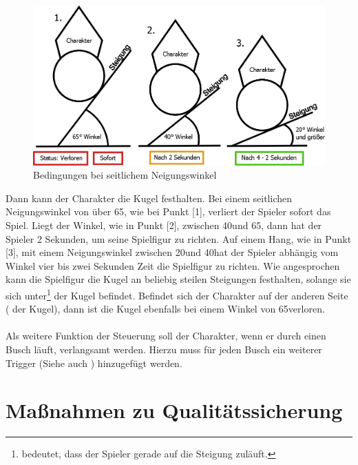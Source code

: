\begin{figure}
\begin{center}
\includegraphics[scale=0.17]{Bilder/Diagramme/VerlierWinkelSeitlich.png}
\end{center}
\begin{footnotesize}
\caption{Bedingungen bei seitlichem Neigungswinkel}
\label{Abb:VerlierWinkelSeitlich}
\end{footnotesize}
\end{figure}

Dann kann der Charakter die Kugel festhalten. Bei einem seitlichen Neigungswinkel von über 65\cc, wie bei Punkt [1], verliert der Spieler sofort das Spiel. Liegt der Winkel, wie in Punkt [2], zwischen 40\cc und 65\cc, dann hat der Spieler 2 Sekunden, um seine Spielfigur zu richten. Auf einem Hang, wie in Punkt [3], mit einem Neigungswinkel zwischen 20\cc und 40\cc hat der Spieler abhängig vom Winkel vier bis zwei Sekunden Zeit die Spielfigur zu richten. Wie angesprochen kann die Spielfigur die Kugel an beliebig steilen Steigungen festhalten, solange sie sich unter\footnote{ bedeutet, dass der Spieler gerade auf die Steigung zuläuft.} der Kugel befindet. Befindet sich der Charakter auf der anderen Seite ( der Kugel), dann ist die Kugel ebenfalls bei einem Winkel von 65\cc verloren.
\paragraph{}
Als weitere Funktion der Steuerung soll der Charakter, wenn er durch einen Busch läuft, verlangsamt werden. Hierzu muss für jeden Busch ein weiterer Trigger (Siehe auch ) hinzugefügt werden.

\section{Maßnahmen zu Qualitätssicherung}
